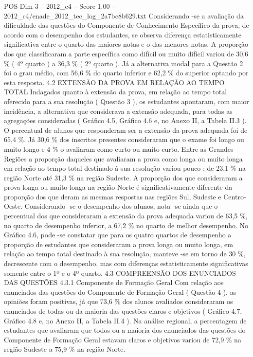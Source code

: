 \begin{textsample}{POS Dim 3 – 2012\_c4 – Score 1.00 – 2012\_c4/enade\_2012\_tec\_log\_2a7bc8b629.txt}
Considerando -se a avaliação da dificuldade das questões do Componente de Conhecimento Específico da prova, de acordo com o desempenho dos estudantes, se observa diferença estatisticamente significativa entre o quarto das maiores notas e o das menores notas.
A proporção dos que classificaram a parte específica como difícil ou muito difícil variou de 30,6 \% ( 4º quarto ) a 36,3 \% ( 2º quarto ).
Já a alternativa modal para a Questão 2 foi o grau médio, com 56,6 \% do quarto inferior e 62,2 \% do superior optando por esta resposta. 4.2 EXTENSÃO DA PROVA EM RELAÇÃO AO TEMPO TOTAL Indagados quanto à extensão da prova, em relação ao tempo total oferecido para a sua resolução ( Questão 3 ), os estudantes apontaram, com maior incidência, a alternativa que considerava a extensão adequada, para todas as agregações consideradas ( Gráfico 4.5, Gráfico 4.6 e, no Anexo II, a Tabela II.3 ).
O percentual de alunos que responderam ser a extensão da prova adequada foi de 65,4 \%.
Já 30,6 \% dos inscritos presentes consideraram que o exame foi longo ou muito longo e 4 \% o avaliaram como curto ou muito curto.
Entre as Grandes Regiões a proporção daqueles que avaliaram a prova como longa ou muito longa em relação ao tempo total destinado à sua resolução variou pouco : de 23,1 \% na região Norte até 31,3 \% na região Sudeste.
A proporção dos que consideraram a prova longa ou muito longa na região Norte é significativamente diferente da proporção dos que deram as mesmas respostas nas regiões Sul, Sudeste e Centro-Oeste.
Considerando -se o desempenho dos alunos, nota -se ainda que o percentual dos que consideraram a extensão da prova adequada variou de 63,5 \%, no quarto de desempenho inferior, a 67,2 \% no quarto de melhor desempenho.
No Gráfico 4.6, pode -se constatar que para os quatro quartos de desempenho a proporção de estudantes que consideraram a prova longa ou muito longa, em relação ao tempo total destinado à sua resolução, manteve -se em torno de 30 \%, decrescente com o desempenho, mas com diferenças estatisticamente significativas somente entre o 1º e o 4º quarto. 4.3 COMPREENSÃO DOS ENUNCIADOS DAS QUESTÕES 4.3.1 Componente de Formação Geral Com relação aos enunciados das questões do Componente de Formação Geral ( Questão 4 ), as opiniões foram positivas, já que 73,6 \% dos alunos avaliados consideraram os enunciados de todas ou da maioria das questões claros e objetivos ( Gráfico 4.7, Gráfico 4.8 e, no Anexo II, a Tabela II.4 ).
Na análise regional, a percentagem de estudantes que avaliaram que todos ou a maioria dos enunciados das questões do Componente de Formação Geral estavam claros e objetivos variou de 72,9 \% na região Sudeste a 75,9 \% na região Norte.

\end{textsample}
